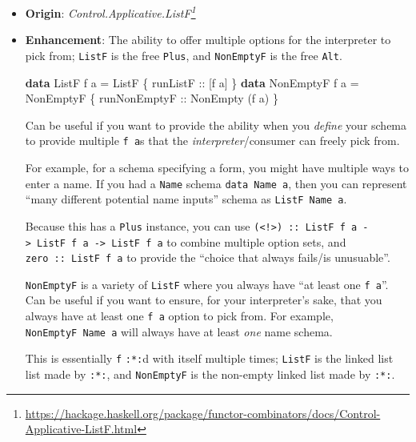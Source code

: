 \documentclass[]{article}
\newenvironment{Shaded}{}{}
\newcommand{\DataTypeTok}[1]{\textcolor[rgb]{0.56,0.13,0.00}{#1}}
\newcommand{\KeywordTok}[1]{\textcolor[rgb]{0.00,0.44,0.13}{\textbf{#1}}}
\newcommand{\NormalTok}[1]{#1}
\newcommand{\OtherTok}[1]{\textcolor[rgb]{0.00,0.44,0.13}{#1}}
\renewcommand{\href}[2]{#2\footnote{\url{#1}}}
\begin{document}
\begin{itemize}
\item
  \textbf{Origin}:
  \emph{\href{https://hackage.haskell.org/package/functor-combinators/docs/Control-Applicative-ListF.html}{Control.Applicative.ListF}}
\item
  \textbf{Enhancement}: The ability to offer multiple options for the
  interpreter to pick from; \texttt{ListF} is the free \texttt{Plus}, and
  \texttt{NonEmptyF} is the free \texttt{Alt}.

\begin{Shaded}
\begin{Highlighting}[]
\KeywordTok{data} \DataTypeTok{ListF}\NormalTok{     f a }\OtherTok{=} \DataTypeTok{ListF}\NormalTok{     \{}\OtherTok{ runListF     ::}\NormalTok{ [f a]          \}}
\KeywordTok{data} \DataTypeTok{NonEmptyF}\NormalTok{ f a }\OtherTok{=} \DataTypeTok{NonEmptyF}\NormalTok{ \{}\OtherTok{ runNonEmptyF ::} \DataTypeTok{NonEmpty}\NormalTok{ (f a) \}}
\end{Highlighting}
\end{Shaded}

  Can be useful if you want to provide the ability when you \emph{define} your
  schema to provide multiple \texttt{f\ a}s that the \emph{interpreter}/consumer
  can freely pick from.

  For example, for a schema specifying a form, you might have multiple ways to
  enter a name. If you had a \texttt{Name} schema \texttt{data\ Name\ a}, then
  you can represent ``many different potential name inputs'' schema as
  \texttt{ListF\ Name\ a}.

  Because this has a \texttt{Plus} instance, you can use
  \texttt{(\textless{}!\textgreater{})\ ::\ ListF\ f\ a\ -\textgreater{}\ ListF\ f\ a\ -\textgreater{}\ ListF\ f\ a}
  to combine multiple option sets, and \texttt{zero\ ::\ ListF\ f\ a} to provide
  the ``choice that always fails/is unusuable''.

  \texttt{NonEmptyF} is a variety of \texttt{ListF} where you always have ``at
  least one \texttt{f\ a}''. Can be useful if you want to ensure, for your
  interpreter's sake, that you always have at least one \texttt{f\ a} option to
  pick from. For example, \texttt{NonEmptyF\ Name\ a} will always have at least
  \emph{one} name schema.

  This is essentially \texttt{f} \texttt{:*:}d with itself multiple times;
  \texttt{ListF} is the linked list list made by \texttt{:*:}, and
  \texttt{NonEmptyF} is the non-empty linked list made by \texttt{:*:}.


\end{itemize}
\end{document}
